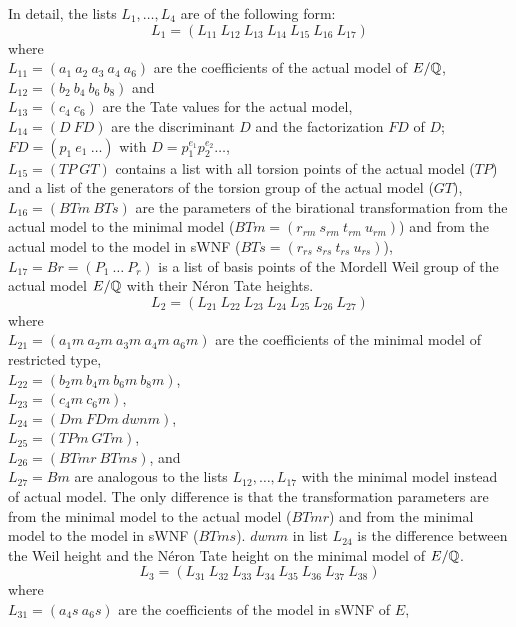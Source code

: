 In detail, the lists $L_1,\ldots, L_4$ are of the following form:
\[L_1 = (L_{11}\  L_{12}\  L_{13}\  L_{14}\  L_{15}\  L_{16}\  L_{17})\]
where \\
$L_{11} = (a_1\  a_2\  a_3\  a_4\ a_6)$ are the coefficients of the actual model
of $E/\mbox{$\mathbb Q$}$, \\ 
$L_{12} = (b_2\  b_4\  b_6\  b_8)$ and \\
$L_{13} = (c_4\  c_6)$ are the Tate values for the actual model, \\
$L_{14} = (D\  FD)$ are the discriminant $D$ and the factorization $FD$ of $D$;
$FD=(p_1\ e_1\ \ldots)$ with $D=p_1^{e_1}p_2^{e_2}\ldots$, \\
$L_{15} = (TP\  GT)$ contains a list with all torsion points of the actual model 
($TP$) and a list of the generators of the torsion group of the actual model
($GT$), \\
$L_{16} = (BTm\  BTs)$ are the parameters of the birational transformation from the actual model
to the minimal model ($BTm=(r_{rm}\ s_{rm}\ t_{rm}\ u_{rm})$) and from the actual model to the model in sWNF 
($BTs=(r_{rs}\ s_{rs}\ t_{rs}\ u_{rs})$), \\
$L_{17} = Br=(P_1\ \ldots\ P_r)$ is a list of basis points of the Mordell Weil group of the actual model $E/\mbox{$\mathbb Q$}$ with their N\'eron Tate heights.
\newpage
\[L_2 = (L_{21}\  L_{22}\  L_{23}\  L_{24}\  L_{25}\  L_{26}\  L_{27})\]
where \\
$L_{21} = (a_1m\  a_2m\  a_3m\  a_4m\ a_6m)$ are the coefficients of the 
minimal model of restricted type, \\
$L_{22} = (b_2m\  b_4m\  b_6m\  b_8m)$, \\
$L_{23} = (c_4m\  c_6m)$, \\
$L_{24} = (Dm\  FDm\  dwnm)$, \\
$L_{25} = (TPm\  GTm)$, \\
$L_{26} = (BTmr\  BTms)$, and \\
$L_{27} = Bm$ are analogous to the lists 
$L_{12}, \ldots, L_{17}$ with the minimal model instead of actual model. The 
only difference is that the transformation parameters are from the minimal
model to the actual model ($BTmr$) and from the minimal model to the model
in sWNF ($BTms$). $dwnm$ in list $L_{24}$ is the difference between the 
Weil height and the N\'{e}ron Tate height on the minimal model of $E/\mbox{$\mathbb Q$}$.
\[L_3 = (L_{31}\  L_{32}\  L_{33}\  L_{34}\  L_{35}\  L_{36}\  L_{37}\  L_{38})\]
where \\
$L_{31} = (a_4s\ a_6s)$ are the coefficients of the model in sWNF of $E$, \\

